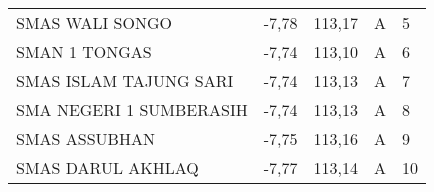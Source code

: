 \begin{table}[h!]
\begin{adjustbox}{width=\columnwidth,center}
\begin{tabular}{lllcl}
SMAS   WALI SONGO                                                                          & -7,78                                                                                          & 113,17                                                                                          & A                                       & 5                                                                                  \\
\rowcolor[HTML]{D9E1F2} 
SMAN 1 TONGAS                                                                              & -7,74                                                                                          & 113,10                                                                                          & A                                       & 6                                                                                  \\
SMAS   ISLAM TAJUNG SARI                                                                   & -7,74                                                                                          & 113,13                                                                                          & A                                       & 7                                                                                  \\
\rowcolor[HTML]{D9E1F2} 
SMA NEGERI 1 SUMBERASIH                                                                    & -7,74                                                                                          & 113,13                                                                                          & A                                       & 8                                                                                  \\
SMAS   ASSUBHAN                                                                            & -7,75                                                                                          & 113,16                                                                                          & A                                       & 9                                                                                  \\
\rowcolor[HTML]{D9E1F2} 
SMAS DARUL AKHLAQ                                                                          & -7,77                                                                                          & 113,14                                                                                          & A                                       & 10                                                                                 \\

\end{tabular}
\end{adjustbox}
\end{table}
